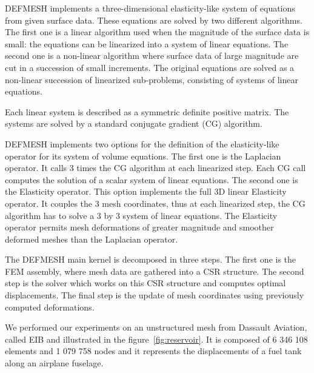 \documentclass[10pt]{IOS-Book-Article}
\begin{document}
DEFMESH implements a three-dimensional elasticity-like system of equations from given surface data.
These equations are solved by two different algorithms.
The first one is a linear algorithm used when the magnitude of the surface data is small: the equations can be linearized into a system of linear equations.
The second one is a non-linear algorithm where surface data of large magnitude are cut in a succession of small increments.
The original equations are solved as a non-linear succession of linearized sub-problems, consisting of systems of linear equations.
 
Each linear system is described as a symmetric definite positive matrix. The systems are solved by a standard conjugate gradient (CG) algorithm.

DEFMESH implements two options for the definition of the elasticity-like operator for its system of volume equations.
The first one is  the Laplacian operator. It calls 3 times the CG algorithm at each linearized step.  Each CG call computes the solution of a scalar system of linear equations.
The second one is the Elasticity operator. This option implements the full 3D linear Elasticity operator.
It couples the 3 mesh coordinates, thus at each linearized step, the CG algorithm has to solve a 3 by 3 system of linear equations.
The Elasticity operator permits mesh deformations of greater magnitude and smoother deformed meshes than the Laplacian operator.

The DEFMESH main kernel is decomposed in three steps.
The first one is the FEM assembly, where mesh data are gathered into a CSR structure.
The second step is the solver which works on this CSR structure and computes optimal displacements.
The final step is the update of mesh coordinates using previously computed deformations.

We performed our experiments on an unstructured mesh from Dassault Aviation, called EIB and illustrated in the figure~\ref{fig:reservoir}.
It is composed of 6 346 108 elements and 1 079 758 nodes and it represents the displacements of a fuel tank along an airplane fuselage.
\end{document}
